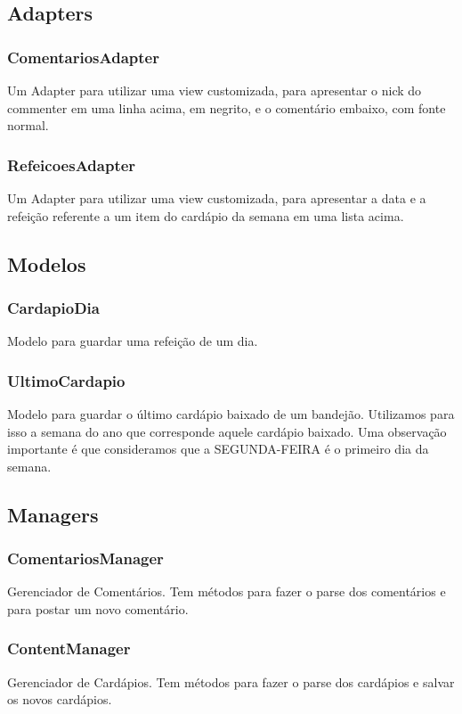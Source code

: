 \subsection{Adapters}
\subsubsection{ComentariosAdapter}
Um Adapter para utilizar uma view customizada, para apresentar o nick do commenter em uma linha acima, em negrito, e o comentário embaixo, com fonte normal.
\subsubsection{RefeicoesAdapter}
Um Adapter para utilizar uma view customizada, para apresentar a data e a refeição referente a um item do cardápio da semana em uma lista acima.

\subsection{Modelos}
\subsubsection{CardapioDia}
Modelo para guardar uma refeição de um dia.

\subsubsection{UltimoCardapio}
Modelo para guardar o último cardápio baixado de um bandejão. Utilizamos para isso a semana do ano que corresponde aquele cardápio baixado. Uma observação importante é que consideramos que a SEGUNDA-FEIRA é o primeiro dia da semana.

\subsection{Managers}
\subsubsection{ComentariosManager}
Gerenciador de Comentários. Tem métodos para fazer o parse dos comentários e para postar um novo comentário.

\subsubsection{ContentManager}
Gerenciador de Cardápios. Tem métodos para fazer o parse dos cardápios e salvar os novos cardápios.

